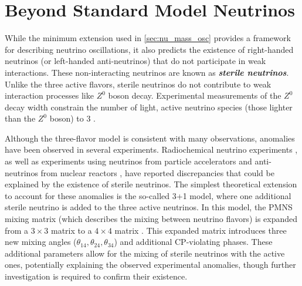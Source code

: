 \section{Beyond Standard Model Neutrinos}
\label{sec:bsm}
While the minimum extension used in \ref{sec:nu_mass_osc} provides a framework for describing neutrino oscillations, it also predicts the existence of right-handed neutrinos (or left-handed anti-neutrinos) that do not participate in weak interactions. These non-interacting neutrinos are known as \textbf{\emph{sterile neutrinos}}. Unlike the three active flavors, sterile neutrinos do not contribute to weak interaction processes like $Z^0$ boson decay. Experimental measurements of the $Z^0$ decay width constrain the number of light, active neutrino species (those lighter than the $Z^0$ boson) to 3 . 

Although the three-flavor model is consistent with many observations, anomalies have been observed in several experiments. Radiochemical neutrino experiments , as well as experiments using neutrinos from particle accelerators  and anti-neutrinos from nuclear reactors , have reported discrepancies that could be explained by the existence of sterile neutrinos. The simplest theoretical extension to account for these anomalies is the so-called 3+1 model, where one additional sterile neutrino is added to the three active neutrinos. In this model, the PMNS mixing matrix (which describes the mixing between neutrino flavors) is expanded from a $ 3 \times 3$ matrix to a $4 \times 4$ matrix . This expanded matrix introduces three new mixing angles ($\theta_{14}, \theta_{24}, \theta_{34} $) and additional CP-violating phases. These additional parameters allow for the mixing of sterile neutrinos with the active ones, potentially explaining the observed experimental anomalies, though further investigation is required to confirm their existence.

